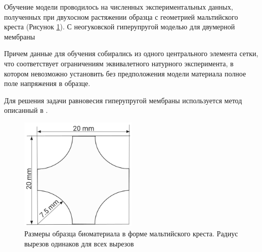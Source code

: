 Обучение модели проводилось на численных экспериментальных данных, 
полученных при двухосном растяжении образца с геометрией мальтийского креста (Рисунок \ref{fig:malt_geometry}).
С неогуковской гиперупругой моделью для двумерной мембраны \cite{ogden1997nonlinear}

Причем данные для обучения собирались из одного центрального элемента сетки, что соответствует ограничениям эквивалетного 
натурного эксперимента, в котором невозможно установить без предположения модели материала полное поле напряжения в образце.

Для решения задачи равновесия гиперупругой мембраны используется метод описанный в \cite{ddaniso2024}.

\begin{figure}[H]
  \centering
  \includegraphics[width=0.5\textwidth]{img/malt_geom.png}
  \caption{Размеры образца биоматериала в форме мальтийского креста. 
  Радиус вырезов одинаков для всех вырезов}
  \label{fig:malt_geometry}
\end{figure}

